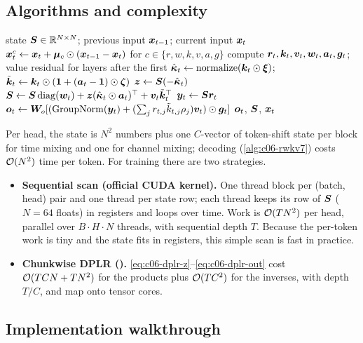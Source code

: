 \subsection{Algorithms and complexity}

\begin{algorithm}[t]
\caption{RWKV-7 time mixing (one head): decoding step}
\label{alg:c06-rwkv7}
\begin{algorithmic}[1]
\Require state $\bm{S}\in\mathbb{R}^{N\times N}$; previous input $\bm{x}_{t-1}$; current input $\bm{x}_t$
\State $\bm{x}^c_t\gets\bm{x}_t+\bm\mu_c\odot(\bm{x}_{t-1}-\bm{x}_t)$ for $c\in\{r,w,k,v,a,g\}$ 
\State compute $\bm{r}_t,\bm{k}_t,\bm{v}_t,\bm{w}_t,\bm{a}_t,\bm{g}_t$; value residual for layers after the first
\State $\hat{\bm\kappa}_t\gets\mathrm{normalize}(\bm{k}_t\odot\bm\xi)$;\quad $\tilde{\bm{k}}_t\gets\bm{k}_t\odot(\bm1+(\bm{a}_t-\bm1)\odot\bm\zeta)$
\State $\bm{z}\gets\bm{S}(-\hat{\bm\kappa}_t)$ 
\State $\bm{S}\gets\bm{S}\operatorname{diag}(\bm{w}_t)+\bm{z}(\hat{\bm\kappa}_t\odot\bm{a}_t)^{\top}+\bm{v}_t\tilde{\bm{k}}_t^{\top}$ 
\State $\bm{y}_t\gets\bm{S}\bm{r}_t$
\State $\bm{o}_t\gets\bm{W}_o[(\mathrm{GroupNorm}(\bm{y}_t)+(\sum_jr_{t,j}\tilde k_{t,j}\rho_j)\bm{v}_t)\odot\bm{g}_t]$
\State \Return $\bm{o}_t$, $\bm{S}$, $\bm{x}_t$ 
\end{algorithmic}
\end{algorithm}

Per head, the state is $N^2$ numbers plus one $C$-vector of token-shift state per block for
time mixing and one for channel mixing; decoding (\cref{alg:c06-rwkv7}) costs $\mathcal{O}(N^2)$
time per token. For training there are two strategies.
\begin{itemize}
\item \textbf{Sequential scan (official CUDA kernel).} One thread block per (batch, head) pair
and one thread per state row; each thread keeps its row of $\bm{S}$ ($N=64$ floats) in registers
and loops over time. Work is $\mathcal{O}(TN^2)$ per head, parallel over $B\cdot H\cdot N$
threads, with sequential depth $T$. Because the per-token work is tiny and the state fits in
registers, this simple scan is fast in practice.
\item \textbf{Chunkwise DPLR (\fla{}).} \eqref{eq:c06-dplr-z}--\eqref{eq:c06-dplr-out} cost
$\mathcal{O}(TC N+TN^2)$ for the products plus $\mathcal{O}(TC^2)$ for the inverses, with depth $T/C$,
and map onto tensor cores.
\end{itemize}

\subsection{Implementation walkthrough}

